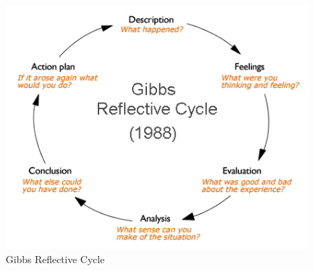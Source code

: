 \begin{figure}[h!]
	\centering
	\includegraphics[width=1.0\linewidth]{img/gibbs-diagram}
	\caption{Gibbs Reflective Cycle}
	\label{fig:gibbs-diagram}
\end{figure}




